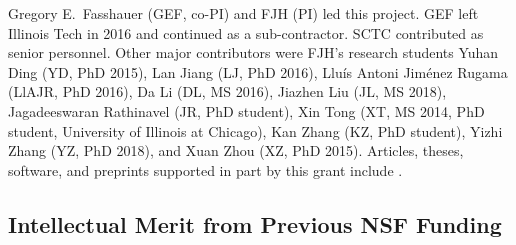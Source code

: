 \documentclass[11pt]{NSFamsart}
\begin{document}
Gregory E.\ Fasshauer (GEF, co-PI) and FJH (PI) led this project.  GEF left Illinois Tech in 2016 and continued as a sub-contractor.  
SCTC contributed as senior personnel.  Other major contributors were FJH's research students Yuhan Ding (YD, PhD 2015), Lan Jiang (LJ, PhD 2016), 
Llu\'is Antoni Jim\'enez Rugama (LlAJR, PhD 2016), Da Li (DL, MS 2016), Jiazhen Liu (JL, MS 2018), Jagadeeswaran Rathinavel (JR, 
PhD student), Xin Tong (XT, MS 2014, PhD student, University of Illinois at Chicago), Kan Zhang (KZ, PhD 
student), Yizhi Zhang (YZ, PhD 2018), and Xuan Zhou (XZ, PhD 2015).  Articles, theses,  
software, and preprints supported in 
part by this 
grant 
include 
\cite{ala_augmented_2017, 
	ChoEtal17a,
	ChoEtal17b,
	Din15a, 
	DinHic20a,
	GilEtal16a,
	Hic17a,
	HicJag18b,
	HicJim16a,
	HicEtal18a,
	HicEtal17a,
	HicKriWoz19a,
	RatHic19a,
	GilJim16b,
	JimHic16a,
	JohFasHic18a,
	Li16a,
	Liu17a,
	MarEtal18a,
	mccourt_stable_2017,
	MCCEtal19a,
	mishra_hybrid_2018,
	MisEtal19a,
	rashidinia_stable_2016,
	rashidinia_stable_2018,
	Zha18a,
	Zha17a,
	Zho15a,
	ZhoHic15a}.

\subsection{Intellectual Merit from Previous NSF Funding}
\label{previousmeritsubsec}

\end{document}
